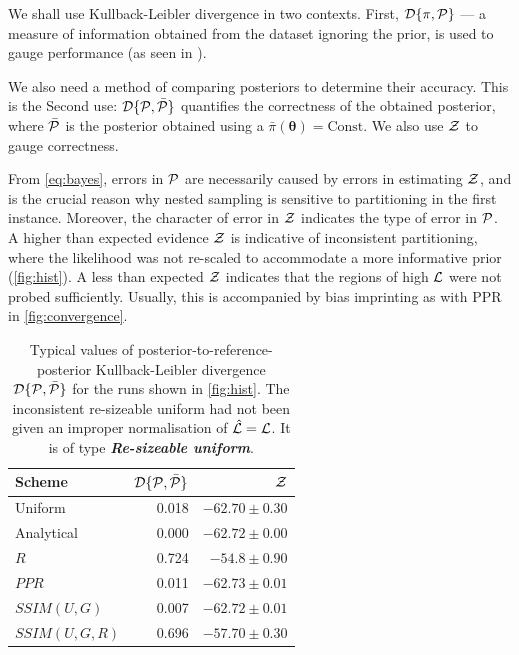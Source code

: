 \documentclass[usenatbib]{mnras}
\begin{document}
We shall use Kullback-Leibler divergence in two contexts. First,
${\cal D}\{\pi, {\cal P}\}$ --- a measure of information obtained from
the dataset ignoring the prior, is used to gauge performance (as seen
in ).

We also need a method of comparing posteriors to determine their
accuracy. This is the Second use:
${\cal D}\{ {\cal P}, \bar{\cal P} \}$ quantifies the correctness of
the obtained posterior, where $\bar{\cal P}$ is the posterior obtained
using a $\bar{\pi}(\bm{\theta}) = \text{Const}$. We also use
${\cal Z}$ to gauge correctness.

From \cref{eq:bayes}, errors in ${\cal P}$ are necessarily caused by
errors in estimating ${\cal Z}$, and is the crucial reason why nested
sampling is sensitive to partitioning in the first instance. Moreover,
the character of error in ${\cal Z}$ indicates the type of error in
${\cal P}$. A higher than expected evidence ${\cal Z}$ is indicative
of inconsistent partitioning, where the likelihood was not re-scaled
to accommodate a more informative prior (\cref{fig:hist}). A less than
expected ${\cal Z}$ indicates that the regions of high ${\cal L}$ were
not probed sufficiently. Usually, this is accompanied by bias
imprinting as with PPR in \cref{fig:convergence}.

\begin{table}
  \centering
  
  \caption{Typical values of posterior-to-reference-posterior
    Kullback-Leibler divergence ${\cal D}\{{\cal P}, \bar{\cal P}\}$
    for the runs shown in \cref{fig:hist}. The inconsistent
    re-sizeable uniform had not been given an improper normalisation
    of $\hat{\cal L} = {\cal L}$. It is of type \textbf{\emph{Re-sizeable
        uniform}}.}
  \begin{tabular}{lrr}
    \textbf{Scheme} & ${\cal D}\{ {\cal P}, \bar{\cal P}\}$ & ${\cal Z}$\\
    \hline
    Uniform & 0.018 & \(-62.70 \pm 0.30\)\\
    Analytical & 0.000 & \(-62.72 \pm 0.00\) \\
    $R$ & 0.724 & \(-54.8 \pm 0.90\)\\
    $PPR$ & 0.011 & \(-62.73 \pm 0.01\)\\
    $SSIM(U, G)$ & 0.007 & \(-62.72 \pm 0.01\)\\
    $SSIM(U, G, R)$ & 0.696 & \(-57.70 \pm 0.30\)\\
  \end{tabular}
  \label{tab:hist}
\end{table}
\end{document}
